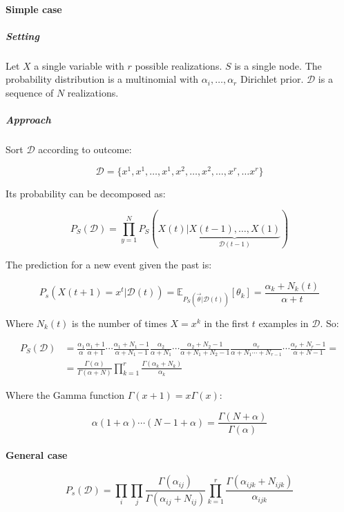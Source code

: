 			\paragraph{Simple case}

				\subparagraph{Setting}
				Let $X$ a single variable with $r$ possible realizations.
				$S$ is a single node.
				The probability distribution is a multinomial with $\alpha_i, \dots, \alpha_r$ Dirichlet prior.
				$\mathcal{D}$ is a sequence of $N$ realizations.

				\subparagraph{Approach}
				Sort $\mathcal{D}$ according to outcome:

				$$\mathcal{D} = \{x^1, x^1, \dots, x^1, x^2, \dots, x^2, \dots, x^r, \dots x^r\}$$

				Its probability can be decomposed as:

				$$P_S(\mathcal{D}) = \prod\limits_{y=1}^NP_S(X(t)|\underbrace{X(t-1),\dots, X(1)}_{\mathcal{D}(t-1)})$$

				The prediction for a new event given the past is:

				$$P_s(X(t+1) = x^t|\mathcal{D}(t)) = \mathbb{E}_{P_S(\vec{\theta}|\mathcal{D}(t))}[\theta_k] = \frac{\alpha_k+N_k(t)}{\alpha+t}$$

				Where $N_k(t)$ is the number of times $X=x^k$ in the first $t$ examples in $\mathcal{D}$.
				So:

				\begin{align*}
					P_S(\mathcal{D}) &= \frac{\alpha_1}{\alpha}\frac{\alpha_1+1}{\alpha+1}\cdots\frac{\alpha_1+N_1-1}{\alpha+N_1-1}\frac{\alpha_2}{\alpha+N_1}\cdots\frac{\alpha_2+N_2-1}{\alpha+N_1+N_2-1}\frac{\alpha_r}{\alpha+N_1\cdots+N_{r-1}}\cdots\frac{\alpha_r+N_r-1}{\alpha+N-1}=\\
													 &=\frac{\Gamma(\alpha)}{\Gamma(\alpha+N)}\prod\limits_{k=1}^r\frac{\Gamma(\alpha_k+N_k)}{\alpha_k}
				\end{align*}

				Where the Gamma function $\Gamma(x+1) = x\Gamma(x)$:

				$$\alpha(1+\alpha)\cdots(N-1+\alpha) = \frac{\Gamma(N+\alpha)}{\Gamma(\alpha)}$$

			\paragraph{General case}

			$$P_s(\mathcal{D}) = \prod\limits_i\prod\limits_j \frac{\Gamma(\alpha_{ij})}{\Gamma(\alpha_{ij}+N_{ij})}\prod\limits_{k=1}^r\frac{\Gamma(\alpha_{ijk}+N_{ijk})}{\alpha_{ijk}}$$

